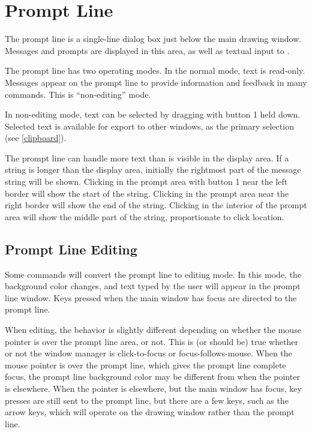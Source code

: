 \section{Prompt Line}
The prompt line is a single-line dialog box just below the main
drawing window.  Messages and prompts are displayed in this area, as
well as textual input to {\Xic}.

The prompt line has two operating modes.  In the normal mode, text is
read-only.  Messages appear on the prompt line to provide information
and feedback in many commands.  This is ``non-editing'' mode.

In non-editing mode, text can be selected by dragging with button 1
held down.  Selected text is available for export to other windows, as
the primary selection (see \ref{clipboard}).

The prompt line can handle more text than is visible in the display
area.  If a string is longer than the display area, initially the
rightmost part of the message string will be shown.  Clicking in the
prompt area with button 1 near the left border will show the start of
the string.  Clicking in the prompt area near the right border will
show the end of the string.  Clicking in the interior of the prompt
area will show the middle part of the string, proportionate to click
location.

\subsection{Prompt Line Editing}
\label{pledit}

Some commands will convert the prompt line to editing mode.  In this
mode, the background color changes, and text typed by the user will
appear in the prompt line window.  Keys pressed when the main window
has focus are directed to the prompt line.

When editing, the behavior is slightly different depending on whether
the mouse pointer is over the prompt line area, or not.  This is (or
should be) true whether or not the window manager is click-to-focus or
focus-follows-mouse.  When the mouse pointer is over the prompt line,
which gives the prompt line complete focus, the prompt line background
color may be different from when the pointer is elsewhere.  When the
pointer is elsewhere, but the main window has focus, key presses are
still sent to the prompt line, but there are a few keys, such as the
arrow keys, which will operate on the drawing window rather than the
prompt line.

